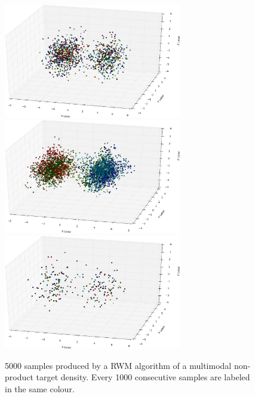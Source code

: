 \begin{figure}[htb]
 \begin{center} 
  \includegraphics[width=0.69\textwidth]{figure_1}
  \vspace*{1mm}
  \vspace*{3mm}
  \includegraphics[width=0.69\textwidth]{figure_2}
  \vspace*{1mm}
  \vspace*{3mm}
  \includegraphics[width=0.69\textwidth]{figure_3}
  \vspace*{1mm}
 \end{center}
  \caption{5000 samples produced by a RWM algorithm of a multimodal non-product target density. Every 1000 consecutive samples are labeled in the same colour.}
  \label{fig:3DscatterplotRWM}
\end{figure}

